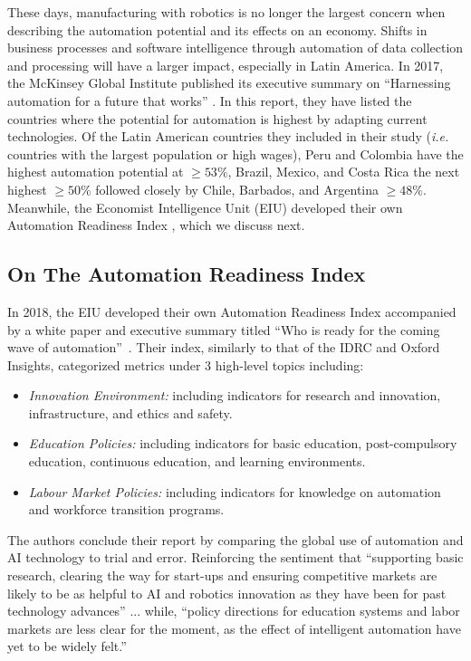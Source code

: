 \documentclass[conference]{IEEEtran}
\begin{document}
These days, manufacturing with robotics is no longer the largest concern when describing the automation potential and its effects on an economy. Shifts in business processes and software intelligence through automation of data collection and processing will have a larger impact, especially in Latin America. In 2017, the McKinsey Global Institute published its executive summary on ``Harnessing automation for a future that works'' \cite{manyika2017future}. In this report, they have listed the countries where the potential for automation is highest by adapting current technologies. Of the Latin American countries they included in their study (\emph{i.e.} countries with the largest population or high wages), Peru and Colombia have the highest automation potential at $\geq 53\%$, Brazil, Mexico, and Costa Rica the next highest $\geq 50\%$ followed closely by Chile, Barbados, and Argentina $\geq 48\%$. Meanwhile, the Economist Intelligence Unit (EIU) developed their own Automation Readiness Index \cite{unit2018automation}, which we discuss next.


\subsection{On The Automation Readiness Index}

In 2018, the EIU developed their own Automation Readiness Index accompanied by a white paper and executive summary titled ``Who is ready for the coming wave of automation''~\cite{unit2018automation}. Their index, similarly to that of the IDRC and Oxford Insights, categorized metrics under 3 high-level topics including:
\begin{itemize}
  \item \emph{Innovation Environment:} including indicators for research and innovation, infrastructure, and ethics and safety.
  \item \emph{Education Policies:} including indicators for basic education, post-compulsory education, continuous education, and learning environments.
  \item \emph{Labour Market Policies:} including indicators for knowledge on automation and workforce transition programs.
\end{itemize}

The authors conclude their report by comparing the global use of automation and AI technology to trial and error. Reinforcing the sentiment that ``supporting basic research, clearing the way for start-ups and ensuring competitive markets are likely to be as helpful to AI and robotics innovation as they have been for past technology advances'' ... while, ``policy directions for education systems and labor markets are less clear for the moment, as the effect of intelligent automation have yet to be widely felt.''
\end{document}
